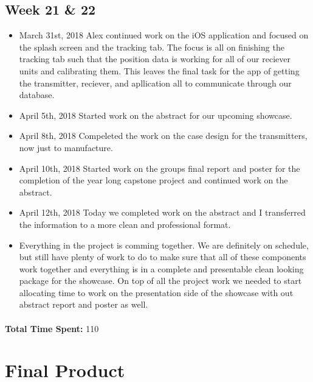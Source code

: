 \documentclass[12pt]{article}
\begin{document}
	\subsection{Week 21 \& 22}
		\begin{itemize}
			\item March 31st, 2018 Alex continued work on the iOS application and focused on the splash screen and the tracking tab. The focus is all on finishing the tracking tab such that the position data is working for all of our reciever units and calibrating them. This leaves the final task for the app of getting the transmitter, reciever, and apllication all to communicate through our database.
			\item April 5th, 2018 Started work on the abstract for our upcoming showcase.
			\item April 8th, 2018 Compeleted the work on the case design for the transmitters, now just to manufacture.
			\item April 10th, 2018 Started work on the groups final report and poster for the completion of the year long capstone project and continued work on the abstract.
			\item April 12th, 2018 Today we completed work on the abstract and I transferred the information to a more clean and professional format.
			\item Everything in the project is comming together. We are definitely on schedule, but still have plenty of work to do to make sure that all of these components work together and everything is in a complete and presentable clean looking package for the showcase. On top of all the project work we needed to start allocating time to work on the presentation side of the showcase with out abstract report and poster as well.
		\end{itemize}

	\paragraph*{}
		\textbf{Total Time Spent: } 110

\section{Final Product}
\end{document}
